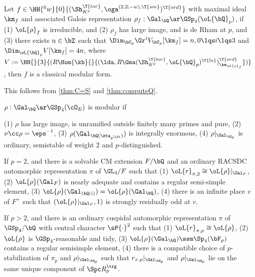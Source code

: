 \documentclass[article, a4paper, twoside]{universal}
\begin{document}
\begin{thm}\label{thm:classicality}
    Let $f\in\HH{{}^{0}w}{0}{(\Sh_{K^{p}}^{\T{tor}},\oga^{(2,2;-w),\T{sm}})^{\T{ord}}}$ with maximal ideal $\km_{f}$ and associated Galois representation $\rho_{f}:\Gal_{\bQ}\ar\GSp_{4}(\oL{\bQ}_{p})$, if (1) $\oL{\rho}_{f}$ is irreducible, and (2) $\rho_{f}$ has large image, and is de Rham at $p$, and (3) there exists $n\in\bZ$ such that $\Dim_{\bC_{p}}\Gr^{i}V_{\bC_{p}}[\km_{f}]=n,0\lqs i\lqs3$ and $\Dim_{\oL{\bQ}_{p}}V[\km_{f}]=4n$, where $V:=\HH{}{3}{(R\Hom{\kb}{}{(\lda,R\Gma(\Sh_{K^{p}}^{\T{tor}},\oL{\bQ}_{p})^{\T{la}})_{\km_{\oL{\rho}_{f}}}^{\T{ord}}})}$, then $f$ is a classical modular form.
\end{thm}

\begin{prf}
    This follows from \cref{thm:C=S} and \cref{thm:computeQ}.
\end{prf}


\begin{thm}
    $\rho:\Gal_{\bQ}\ar\GSp_{4}(\cO_{E})$ is modular if
    \begin{itm}
        \item (1) $\rho$ has large image, is unramified outside finitely many primes and pure, (2) $\nu\cc\rho=\eps^{-1}$, (3) $\rho(\Gal_{\bQ(\zta_{p^{\ift}})})$ is integrally enormous, (4) $\rho|_{\Gal_{\bQ_{p}}}$ is ordinary, semistable of weight $2$ and $p$-distinguished.
        \item If $p=2$, and there is a solvable CM extension $F/\bQ$ and an ordinary RACSDC automorphic representation $\pi$ of $\GL_{4}/F$ such that (1) $\oL{r}_{\pi,2}\cong\oL{\rho}|_{\Gal_{F}}$, (2) $\oL{\rho}(\Gal_{F})$ is nearly adequate and contains a regular semi-simple element, (3) $\oL{\rho}(\Gal_{\bQ(i)})=\oL{\rho}(\Gal_{\bQ})$, (4) there is an infinite place $v$ of $F^{+}$ such that $(\oL{\rho}|_{\Gal_{F}},1)$ is strongly residually odd at $v$.
        \item If $p>2$, and there is an ordinary cuspidal automorphic representation $\pi$ of $\GSp_{4}/\bQ$ with central character $\sP{\cdot}^{2}$ such that (1) $\oL{r}_{\pi,p}\cong\oL{\rho}$, (2) $\oL{\rho}$ is $\GSp_{4}$-reasonable and tidy, (3) $\oL{\rho}(\Gal_{\bQ})\ssm\Sp_{4}(\bF_{p})$ contains a regular semisimple element, (4) there is a compatible choice of $p$-stabilization of $\pi_{p}$ and $\rho|_{\Gal_{\bQ_{p}}}$ such that $r_{\pi,p}|_{\Gal_{\bQ_{p}}}$ and $\rho|_{\Gal_{\bQ_{p}}}$ lie on the same unique component of $\Spc R_{p}^{\trg}$.
    \end{itm}
\end{thm}
\end{document}
